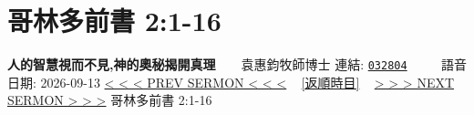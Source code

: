 \documentclass{book}
\begin{document}
\section{哥林多前書 2:1-16}
\label{sec:032804}
\textbf{人的智慧視而不見,神的奧秘揭開真理}~~~~袁惠鈞牧師博士
\newline
\newline
連結: \href{http://www.church.com.hk/acms/content.asp?site=cdc\&op=show\&type=product\&code=032804\&layout=sermon}{\texttt{032804}} ~~~~ 語音日期: 2026-09-13
\newline
\newline
\hyperref[sec:032803]{\small{< < < PREV SERMON < < <}}
~
\hyperref[sec:index_chronic]{\small{[返順時目]}}
~
\hyperref[sec:032805]{\small{> > > NEXT SERMON > > >}}
\newline
\newline
哥林多前書 2:1-16
\newline
\end{document}
